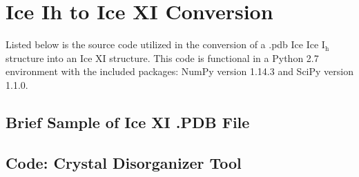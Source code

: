 \chapter{Ice Ih to Ice XI Conversion}
\label{ch:App:CrystalDisorg}

Listed below is the source code utilized in the conversion of a .pdb Ice Ice I$\mathrm{_{h}}$ structure into an Ice XI structure. This code is functional in a Python 2.7 environment with the included packages: NumPy version 1.14.3 and SciPy version 1.1.0.

\section{Brief Sample of Ice XI .PDB File}


\section{Code: Crystal Disorganizer Tool}


%
%
%
%
%
%

%
%
%
%


